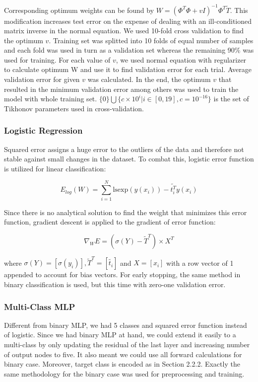 \documentclass[10pt]{article}
\begin{document}
Corresponding optimum weights can be found by $W = (\Phi^T\Phi + vI)^{-1}\Phi^T \tilde{T}$. This modification increases test error on the expense of dealing with an ill-conditioned matrix inverse in the normal equation. We used 10-fold cross validation to find the optimum $v$. Training set was splitted into 10 folds of equal number of samples and each fold was used in turn as a validation set whereas the remaining 90\% was used for training. For each value of $v$, we used normal equation with regularizer to calculate optimum W and use it to find validation error for each trial. Average validation error for given $v$ was calculated. In the end, the optimum $v$ that resulted in the minimum validation error among others was used to train the model with whole training set. $\{0\} \bigcup \{c \times 10^i | i \in [0, 19], c=10^{-16} \}$ is the set of Tikhonov parameters used in cross-validation.

\subsubsection{Logistic Regression}

Squared error assigns a huge error to the outliers of the data and therefore not stable against small changes in the dataset. To combat this, logistic error function is utilized for linear classification:

\begin{equation}\label{eq:logerr}E_{log}(W)=\sum^N_{i=1} \text{lsexp}(y(x_i)) - \tilde{t_i^T} y(x_i)\end{equation}

Since there is no analytical solution to find the weight that minimizes this error function, gradient descent is applied to the gradient of error function:

\begin{equation}\nabla_{W} E = (\sigma(Y) - \tilde{T}^T) \times X^T\end{equation}

where $\sigma(Y) = [\sigma(y_i)], \tilde{T}^T = [\tilde{t_i}]$ and $X = [x_i]$ with a row vector of 1 appended to account for bias vectors. For early stopping, the same method in binary classification is used, but this time with zero-one validation error. 

\subsubsection{Multi-Class MLP}

Different from binary MLP, we had 5 classes and squared error function instead of logistic. Since we had binary MLP at hand, we could extend it easily to a multi-class by only updating the residual of the last layer and increasing number of output nodes to five. It also meant we could use all forward calculations for binary case. Moreover, target class is encoded as in Section 2.2.2. Exactly the same methodology for the binary case was used for preprocessing and training.
\end{document}
